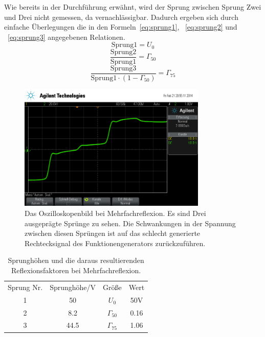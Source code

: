 Wie bereits in der Durchführung erwähnt, wird der Sprung zwischen Sprung
Zwei und Drei nicht gemessen, da vernachlässigbar.  Dadurch ergeben sich
durch einfache Überlegungen die in den Formeln~\eqref{eq:sprung1},
~\eqref{eq:sprung2} und ~\eqref{eq:sprung3} angegebenen Relationen.
%
\begin{equation}
  \text{Sprung1} = U_0
  \label{eq:sprung1}
\end{equation}
%
\begin{equation}
  \frac{\text{Sprung2}}{\text{Sprung1}} = \Gamma_{50}
  \label{eq:sprung2}
\end{equation}
%
\begin{equation}
  \frac{\text{Sprung3}}{\text{Sprung1}\cdot\left(1 - \Gamma_{50}\right)} = \Gamma_{75}
  \label{eq:sprung3}
\end{equation}
%
\begin{figure}[]
  \centering
  \includegraphics[width=0.8\textwidth]{reflex.png}
  \caption{Das Oszilloskopenbild bei Mehrfachreflexion. Es sind Drei
    ausgeprägte Sprünge zu sehen. Die Schwankungen in der Spannung
    zwischen diesen Sprüngen ist auf das schlecht generierte
    Rechtecksignal des Funktionengenerators zurückzuführen.}
  \label{fig:mehrfachreflex}
\end{figure}
%
\begin{table}[h]
  \centering
  \begin{tabular}{SSSS}
    \toprule
    {Sprung Nr.}&{Sprunghöhe/}\si{\volt}&
    {Größe}&{Wert}\\
    \cmidrule(r){1-2} \cmidrule(l){3-4}
    1&50&{$U_0$}&50\si{\volt}\\
    2&8.2&{$\Gamma_{50}$}&0.16\\
    3&44.5&{$\Gamma_{75}$}&1.06\\
    \bottomrule
  \end{tabular}
  \caption{Sprunghöhen und die daraus resultierenden 
    Reflexionsfaktoren bei Mehrfachreflexion.}
  \label{tab:mehrfachreflex}
\end{table}
%
\FloatBarrier
%

